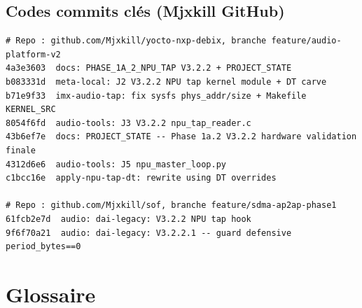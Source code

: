 \documentclass[11pt,a4paper]{article}
\begin{document}
\subsection{Codes commits clés (Mjxkill GitHub)}

\begin{lstlisting}
# Repo : github.com/Mjxkill/yocto-nxp-debix, branche feature/audio-platform-v2
4a3e3603  docs: PHASE_1A_2_NPU_TAP V3.2.2 + PROJECT_STATE
b083331d  meta-local: J2 V3.2.2 NPU tap kernel module + DT carve
b71e9f33  imx-audio-tap: fix sysfs phys_addr/size + Makefile KERNEL_SRC
8054f6fd  audio-tools: J3 V3.2.2 npu_tap_reader.c
43b6ef7e  docs: PROJECT_STATE -- Phase 1a.2 V3.2.2 hardware validation finale
4312d6e6  audio-tools: J5 npu_master_loop.py
c1bcc16e  apply-npu-tap-dt: rewrite using DT overrides

# Repo : github.com/Mjxkill/sof, branche feature/sdma-ap2ap-phase1
61fcb2e7d  audio: dai-legacy: V3.2.2 NPU tap hook
9f6f70a21  audio: dai-legacy: V3.2.2.1 -- guard defensive period_bytes==0
\end{lstlisting}

\appendix
\section{Glossaire}
\end{document}
